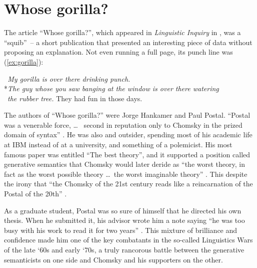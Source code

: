 


\section{Whose gorilla?}

The article ``Whose gorilla?'', which appeared in \textit{Linguistic Inquiry} in \citeyear{Hankamer1973}, was a ``squib''~-- a short publication that presented an interesting piece of data without proposing an explanation. Not even running a full page, its punch line was (\ref{ex:gorilla}):

\ea \label{ex:gorilla}
 \textit{~My gorilla is over there drinking punch.} \\
 *\textit{The guy whose you saw banging at the window is over there watering}\\~\textit{the rubber tree.}
\z
They had fun in those days.

The authors of ``Whose gorilla?'' were Jorge Hankamer and Paul Postal. ``Postal was a venerable force, \dots~ second in reputation only to Chomsky in the prized domain of syntax'' \citep[127--128]{Harris2021}. He was also and outsider, spending most of his academic life at IBM instead of at a university, and something of a polemicist. His most famous paper was entitled ``The best theory'', and it supported a position called generative semantics that Chomsky would later deride as ``the worst theory, in fact as the worst possible theory \dots~the worst imaginable theory'' \citep[129]{Harris2021}. This despite the irony that ``the Chomsky of the 21st century reads like a reincarnation of the Postal of the 20th'' \citep[418]{Newmeyer2003}. 

As a graduate student, Postal was so sure of himself that he directed his own thesis. When he submitted it, his advisor wrote him a note saying ``he was too busy with his work to read it for two years'' \citep{PostalInterview2020}. This mixture of brilliance and confidence made him one of the key combatants in the so-called Linguistics Wars of the late `60s and early `70s, a truly rancorous battle between the generative semanticists on one side and Chomsky and his supporters on the other.

